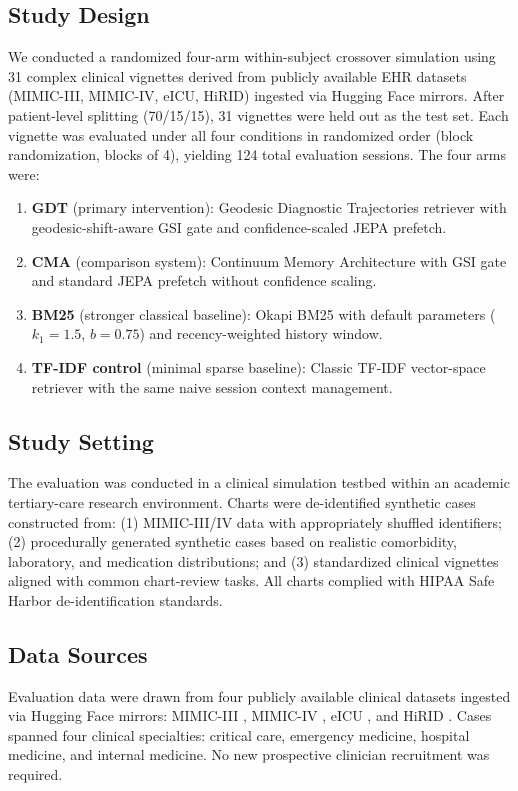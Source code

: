\documentclass[11pt]{article}
\begin{document}
\subsection{Study Design}
We conducted a randomized four-arm within-subject crossover simulation using 31 complex clinical vignettes derived from publicly available EHR datasets (MIMIC-III, MIMIC-IV, eICU, HiRID) ingested via Hugging Face mirrors. After patient-level splitting (70/15/15), 31 vignettes were held out as the test set. Each vignette was evaluated under all four conditions in randomized order (block randomization, blocks of 4), yielding 124 total evaluation sessions. The four arms were:
\begin{enumerate}
  \item \textbf{GDT} (primary intervention): Geodesic Diagnostic Trajectories retriever with geodesic-shift-aware GSI gate and confidence-scaled JEPA prefetch.
  \item \textbf{CMA} (comparison system): Continuum Memory Architecture with GSI gate and standard JEPA prefetch without confidence scaling.
  \item \textbf{BM25} (stronger classical baseline): Okapi BM25 \citep{robertson1995} with default parameters ($k_1=1.5$, $b=0.75$) and recency-weighted history window.
  \item \textbf{TF-IDF control} (minimal sparse baseline): Classic TF-IDF vector-space retriever \citep{salton83} with the same naive session context management.
\end{enumerate}

\subsection{Study Setting}
The evaluation was conducted in a clinical simulation testbed within an academic tertiary-care research environment. Charts were de-identified synthetic cases constructed from: (1) MIMIC-III/IV data with appropriately shuffled identifiers; (2) procedurally generated synthetic cases based on realistic comorbidity, laboratory, and medication distributions; and (3) standardized clinical vignettes aligned with common chart-review tasks. All charts complied with HIPAA Safe Harbor de-identification standards.

\subsection{Data Sources}
Evaluation data were drawn from four publicly available clinical datasets ingested via Hugging Face mirrors: MIMIC-III \citep{johnson2016_mimic3}, MIMIC-IV \citep{pollard2018_mimic4}, eICU \citep{pollard2018_eicu}, and HiRID \citep{muller2021_hirid}. Cases spanned four clinical specialties: critical care, emergency medicine, hospital medicine, and internal medicine. No new prospective clinician recruitment was required.
\end{document}
